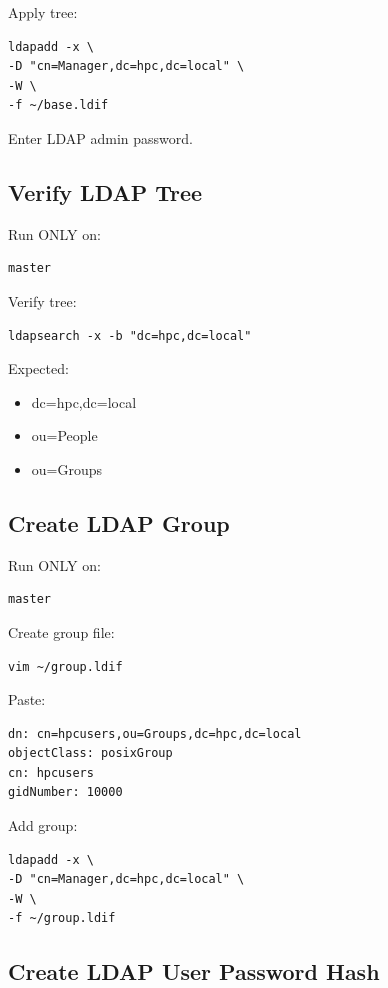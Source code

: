 \documentclass[11pt]{article}
\begin{document}
Apply tree:

\begin{verbatim}
ldapadd -x \
-D "cn=Manager,dc=hpc,dc=local" \
-W \
-f ~/base.ldif
\end{verbatim}

Enter LDAP admin password.
\subsection{Verify LDAP Tree}
\label{sec:orgadfd027}

Run ONLY on:

\begin{verbatim}
master
\end{verbatim}

Verify tree:

\begin{verbatim}
ldapsearch -x -b "dc=hpc,dc=local"
\end{verbatim}

Expected:

\begin{itemize}
\item dc=hpc,dc=local
\item ou=People
\item ou=Groups
\end{itemize}
\subsection{Create LDAP Group}
\label{sec:orgc4d19b8}

Run ONLY on:

\begin{verbatim}
master
\end{verbatim}

Create group file:

\begin{verbatim}
vim ~/group.ldif
\end{verbatim}

Paste:

\begin{verbatim}
dn: cn=hpcusers,ou=Groups,dc=hpc,dc=local
objectClass: posixGroup
cn: hpcusers
gidNumber: 10000
\end{verbatim}

Add group:

\begin{verbatim}
ldapadd -x \
-D "cn=Manager,dc=hpc,dc=local" \
-W \
-f ~/group.ldif
\end{verbatim}
\subsection{Create LDAP User Password Hash}
\label{sec:orga9896ab}
\end{document}
